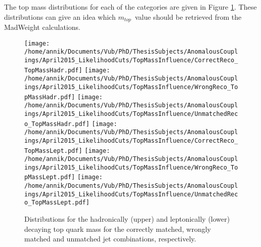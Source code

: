 \documentclass[a4paper,10pt]{article}
\newcommand{\mTop}{$m_{top}$~}
\begin{document}
The top mass distributions for each of the categories are given in Figure \ref{fig::MTRecoDistr}. These distributions can give an idea which \mTop value should be retrieved from the MadWeight calculations.
\begin{figure}[h!t]
 \centering
 \texttt{[image: /home/annik/Documents/Vub/PhD/ThesisSubjects/AnomalousCouplings/April2015\_LikelihoodCuts/TopMassInfluence/CorrectReco\_TopMassHadr.pdf]}
 \texttt{[image: /home/annik/Documents/Vub/PhD/ThesisSubjects/AnomalousCouplings/April2015\_LikelihoodCuts/TopMassInfluence/WrongReco\_TopMassHadr.pdf]}
 \texttt{[image: /home/annik/Documents/Vub/PhD/ThesisSubjects/AnomalousCouplings/April2015\_LikelihoodCuts/TopMassInfluence/UnmatchedReco\_TopMassHadr.pdf]}
 \texttt{[image: /home/annik/Documents/Vub/PhD/ThesisSubjects/AnomalousCouplings/April2015\_LikelihoodCuts/TopMassInfluence/CorrectReco\_TopMassLept.pdf]}
 \texttt{[image: /home/annik/Documents/Vub/PhD/ThesisSubjects/AnomalousCouplings/April2015\_LikelihoodCuts/TopMassInfluence/WrongReco\_TopMassLept.pdf]}
 \texttt{[image: /home/annik/Documents/Vub/PhD/ThesisSubjects/AnomalousCouplings/April2015\_LikelihoodCuts/TopMassInfluence/UnmatchedReco\_TopMassLept.pdf]}
 \caption{Distributions for the hadronically (upper) and leptonically (lower) decaying top quark mass for the correctly matched, wrongly matched and unmatched jet combinations, respectively.}
 \label{fig::MTRecoDistr}
\end{figure}


\end{document}
